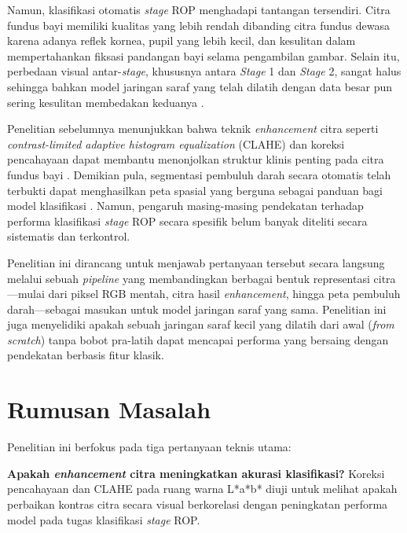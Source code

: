 Namun, klasifikasi otomatis \textit{stage} ROP menghadapi tantangan tersendiri. Citra fundus
bayi memiliki kualitas yang lebih rendah dibanding citra fundus dewasa karena adanya reflek
kornea, pupil yang lebih kecil, dan kesulitan dalam mempertahankan fiksasi pandangan bayi
selama pengambilan gambar. Selain itu, perbedaan visual antar-\textit{stage}, khususnya antara
\textit{Stage} 1 dan \textit{Stage} 2, sangat halus sehingga bahkan model jaringan saraf yang
telah dilatih dengan data besar pun sering kesulitan membedakan keduanya \citep{Zhao2024}.

Penelitian sebelumnya menunjukkan bahwa teknik \textit{enhancement} citra seperti
\textit{contrast-limited adaptive histogram equalization} (CLAHE) dan koreksi pencahayaan dapat
membantu menonjolkan struktur klinis penting pada citra fundus bayi \citep{Rahim2024}.
Demikian pula, segmentasi pembuluh darah secara otomatis telah terbukti dapat menghasilkan
peta spasial yang berguna sebagai panduan bagi model klasifikasi \citep{Almeida2024}. Namun,
pengaruh masing-masing pendekatan terhadap performa klasifikasi \textit{stage} ROP secara
spesifik belum banyak diteliti secara sistematis dan terkontrol.

Penelitian ini dirancang untuk menjawab pertanyaan tersebut secara langsung melalui sebuah
\textit{pipeline} yang membandingkan berbagai bentuk representasi citra---mulai dari piksel
RGB mentah, citra hasil \textit{enhancement}, hingga peta pembuluh darah---sebagai masukan
untuk model jaringan saraf yang sama. Penelitian ini juga menyelidiki apakah sebuah jaringan
saraf kecil yang dilatih dari awal (\textit{from scratch}) tanpa bobot pra-latih dapat
mencapai performa yang bersaing dengan pendekatan berbasis fitur klasik.

\section{Rumusan Masalah}

Penelitian ini berfokus pada tiga pertanyaan teknis utama:

\vspace{2mm}
\noindent\textbf{Apakah \textit{enhancement} citra meningkatkan akurasi klasifikasi?}
Koreksi pencahayaan dan CLAHE pada ruang warna L*a*b* diuji untuk melihat apakah
perbaikan kontras citra secara visual berkorelasi dengan peningkatan performa model
pada tugas klasifikasi \textit{stage} ROP.

